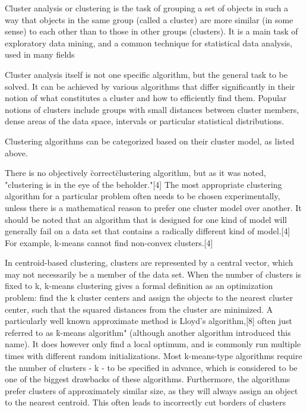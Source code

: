 
Cluster analysis or clustering is the task of grouping a set of objects in such a way that objects 
in the same group (called a cluster) are more similar (in some sense) to each other than to those in 
other groups (clusters). It is a main task of exploratory data mining, and a common technique for 
statistical data analysis, used in many fields

%
Cluster analysis itself is not one specific algorithm, but the general task to be solved. It can be 
achieved by various algorithms that differ significantly in their notion of what constitutes a cluster 
and how to efficiently find them. Popular notions of clusters include groups with small distances 
between cluster members, dense areas of the data space, intervals or particular statistical 
distributions.

%
Clustering algorithms can be categorized based on their cluster model, as listed above. 

%
There is no objectively \"correct\" clustering algorithm, but as it was noted, "clustering is in the
eye of the beholder."[4] The most appropriate clustering algorithm for a particular problem often 
needs to be chosen experimentally, unless there is a mathematical reason to prefer one cluster model 
over another. It should be noted that an algorithm that is designed for one kind of model will 
generally fail on a data set that contains a radically different kind of model.[4] For example, 
k-means cannot find non-convex clusters.[4]

%
In centroid-based clustering, clusters are represented by a central vector, which may not necessarily
 be a member of the data set. When the number of clusters is fixed to k, k-means clustering gives a 
 formal definition as an optimization problem: find the k cluster centers and assign the objects to the
  nearest cluster center, such that the squared distances from the cluster are minimized.
%
A particularly well known approximate method is Lloyd's algorithm,[8] often just referred to as 
\"k-means algorithm" (although another algorithm introduced this name). It does however only find a 
local optimum, and is commonly run multiple times with different random initializations.
%
Most k-means-type algorithms require the number of clusters - k - to be specified in advance, which is considered to be one of the biggest drawbacks of these algorithms. Furthermore, the algorithms prefer clusters of approximately similar size, as they will always assign an object to the nearest centroid. This often leads to incorrectly cut borders of clusters